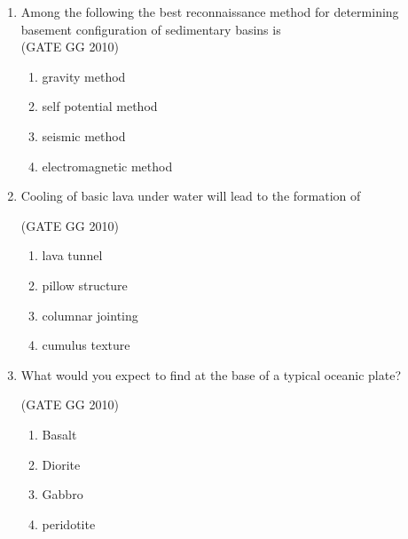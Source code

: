 \documentclass[journal]{IEEEtran}
\begin{document}
\begin{enumerate}
\begin{multicols}{4}
\begin{enumerate}
\item$1.5\degree$
\item$7.5\degree$
\item$11.5\degree$
\item$23.5\degree$
\end{enumerate}
\end{multicols}

\item Among the following the best reconnaissance method for determining basement configuration of sedimentary basins is\\

\hfill(GATE GG 2010)
\begin{multicols}{2}
\begin{enumerate}
    \item gravity method
    \item self potential method
    \item seismic method
    \item electromagnetic method
\end{enumerate}
\end{multicols}

\item Cooling of basic lava under water will lead to the formation of

\hfill (GATE GG 2010)
\begin{multicols}{2}

\begin{enumerate}
    \item lava tunnel
    \item pillow structure
    \item columnar jointing
    \item cumulus texture
\end{enumerate}
\end{multicols}

\item What would you expect to find at the base of a typical oceanic plate?

\hfill (GATE GG 2010) 
\begin{multicols}{4}

\begin{enumerate}
    \item Basalt
    \item Diorite
    \item Gabbro
    \item peridotite
\end{enumerate}
\end{multicols}


\end{enumerate}
\end{document}
